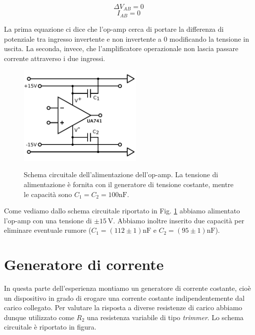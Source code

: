 \begin{equation}
\Delta V_{AB}=0
\label{eq:regola_V}
\end{equation}
\begin{equation}
I_{AB}=0
\label{eq:regola_I}
\end{equation}

La prima equazione ci dice che l'op-amp cerca di portare la differenza di potenziale tra ingresso invertente e non invertente a $0$ modificando la tensione in uscita. La seconda, invece, che l'amplificatore operazionale non lascia passare corrente attraverso i due ingressi.


\begin{figure}[ht]
 \centering
   {\includegraphics[width=6cm]{../E01/latex/alimentazione.pdf}}
 \caption{Schema circuitale dell'alimentazione dell'op-amp. La tensione di alimentazione è fornita con il generatore di tensione costante, mentre le capacità sono $C_1=C_2=100 \si{\nano\farad}$.}
 \label{gr:costante}
\end{figure}

Come vediamo dallo schema circuitale riportato in Fig. \ref{gr:costante} abbiamo alimentato l'op-amp con una tensione di $\pm \SI{15}{\volt}$. Abbiamo inoltre inserito due capacità per eliminare eventuale rumore ($C_1=(112 \pm 1)\si{\nano\farad}$ e $C_2=(95\pm 1)\si{\nano\farad}$).

\section{Generatore di corrente}

In questa parte dell'esperienza montiamo un generatore di corrente costante, cioè un dispositivo in grado di erogare una corrente costante indipendentemente dal carico collegato. Per valutare la risposta a diverse resistenze di carico abbiamo dunque utilizzato come $R_2$ una resistenza variabile di tipo \textit{trimmer}. Lo schema circuitale è riportato in figura.

